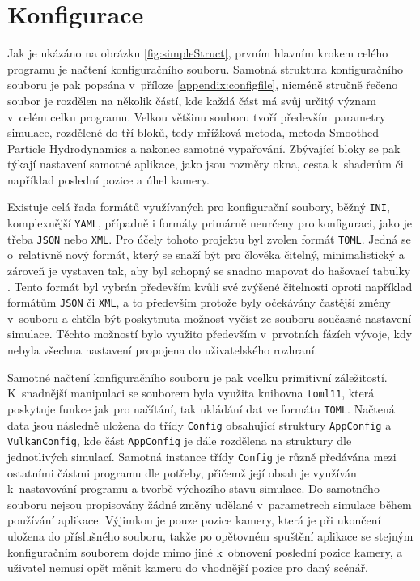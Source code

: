 \section{Konfigurace}
\label{chapter:konfigurace}
Jak je ukázáno na obrázku \ref{fig:simpleStruct}, prvním hlavním krokem celého programu je načtení konfiguračního souboru. Samotná struktura konfiguračního souboru je pak popsána v~příloze \ref{appendix:configfile}, nicméně stručně řečeno soubor je rozdělen na několik částí, kde každá část má svůj určitý význam v~celém celku programu. Velkou většinu souboru tvoří především parametry simulace, rozdělené do tří bloků, tedy mřížková metoda, metoda Smoothed Particle Hydrodynamics a nakonec samotné vypařování. Zbývající bloky se pak týkají nastavení samotné aplikace, jako jsou rozměry okna, cesta k~shaderům či například poslední pozice a úhel kamery.

Existuje celá řada formátů využívaných pro konfigurační soubory, běžný \texttt{INI}, komplexnější \texttt{YAML}, případně i formáty primárně neurčeny pro konfiguraci, jako je třeba \texttt{JSON} nebo \texttt{XML}. Pro účely tohoto projektu byl zvolen formát \texttt{TOML}. Jedná se o~relativně nový formát, který se snaží být pro člověka čitelný, minimalistický a zároveň je vystaven tak, aby byl schopný se snadno mapovat do hašovací tabulky \cite{toml-lang}. Tento formát byl vybrán především kvůli své zvýšené čitelnosti oproti například formátům \texttt{JSON} či \texttt{XML}, a to především protože byly očekávány častější změny v~souboru a chtěla být poskytnuta možnost vyčíst ze souboru současné nastavení simulace. Těchto možností bylo využito především v~prvotních fázích vývoje, kdy nebyla všechna nastavení propojena do uživatelského rozhraní.

Samotné načtení konfiguračního souboru je pak vcelku primitivní záležitostí. K~snadnější manipulaci se souborem byla využita knihovna \texttt{toml11}, která poskytuje funkce jak pro načítání, tak ukládání dat ve formátu \texttt{TOML}. Načtená data jsou následně uložena do třídy \texttt{Config} obsahující struktury \texttt{AppConfig} a \texttt{VulkanConfig}, kde část \texttt{AppConfig} je dále rozdělena na struktury dle jednotlivých simulací. Samotná instance třídy \texttt{Config} je různě předávána mezi ostatními částmi programu dle potřeby, přičemž její obsah je využíván k~nastavování programu a tvorbě výchozího stavu simulace. Do samotného souboru nejsou propisovány žádné změny udělané v~parametrech simulace během používání aplikace. Výjimkou je pouze pozice kamery, která je při ukončení uložena do příslušného souboru, takže po opětovném spuštění aplikace se stejným konfiguračním souborem dojde mimo jiné k~obnovení poslední pozice kamery, a uživatel nemusí opět měnit kameru do vhodnější pozice pro daný scénář.

